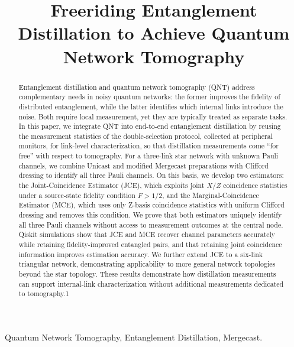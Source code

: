 \documentclass[conference]{IEEEtran}
\title{Freeriding Entanglement Distillation to Achieve Quantum Network Tomography}
\theoremstyle{definition}
\begin{document}
\maketitle

\begin{abstract}




Entanglement distillation and quantum network tomography (QNT) address complementary needs in noisy quantum networks: the former improves the fidelity of distributed entanglement, while the latter identifies which internal links introduce the noise. Both require local measurement, yet they are typically treated as separate tasks. In this paper, we integrate QNT into end-to-end entanglement distillation by reusing the measurement statistics of the double-selection protocol, collected at peripheral monitors, for link-level characterization, so that distillation measurements come ``for free'' with respect to tomography. For a three-link star network with unknown Pauli channels, we combine Unicast and modified Mergecast preparations with Clifford dressing to identify all three Pauli channels. On this basis, we develop two estimators: the Joint-Coincidence Estimator (JCE), which exploits joint $X/Z$ coincidence statistics under a source-state fidelity condition $F > 1/2$, and the Marginal-Coincidence Estimator (MCE), which uses only Z-basis coincidence statistics with uniform Clifford dressing and removes this condition. We prove that both estimators uniquely identify all three Pauli channels without access to measurement outcomes at the central node. Qiskit simulations show that JCE and MCE recover channel parameters accurately while retaining fidelity-improved entangled pairs, and that retaining joint coincidence information improves estimation accuracy. We further extend JCE to a six-link triangular network, demonstrating applicability to more general network topologies beyond the star topology. These results demonstrate how distillation measurements can
support internal-link characterization without additional
measurements dedicated to tomography.1
\end{abstract}

\begin{IEEEkeywords}
Quantum Network Tomography, Entanglement Distillation, Mergecast.
\end{IEEEkeywords}










\appendices
% 


\end{document}
